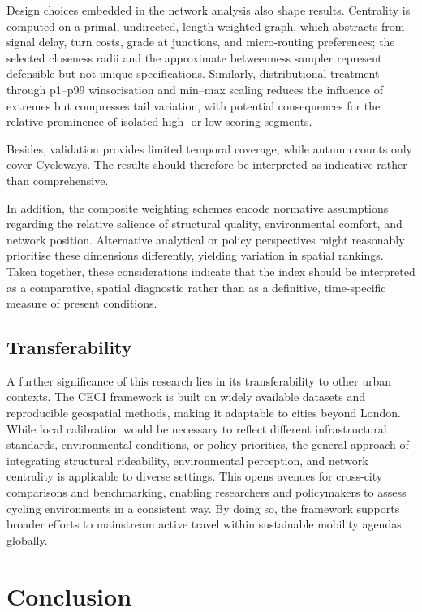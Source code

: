 \documentclass[
  12pt,
  oneside]{book}
\begin{document}
Design choices embedded in the network analysis also shape results. Centrality is computed on a primal, undirected, length-weighted graph, which abstracts from signal delay, turn costs, grade at junctions, and micro-routing preferences; the selected closeness radii and the approximate betweenness sampler represent defensible but not unique specifications. Similarly, distributional treatment through p1--p99 winsorisation and min--max scaling reduces the influence of extremes but compresses tail variation, with potential consequences for the relative prominence of isolated high- or low-scoring segments.

Besides, validation provides limited temporal coverage, while autumn counts only cover Cycleways. The results should therefore be interpreted as indicative rather than comprehensive.

In addition, the composite weighting schemes encode normative assumptions regarding the relative salience of structural quality, environmental comfort, and network position. Alternative analytical or policy perspectives might reasonably prioritise these dimensions differently, yielding variation in spatial rankings. Taken together, these considerations indicate that the index should be interpreted as a comparative, spatial diagnostic rather than as a definitive, time-specific measure of present conditions.

\section{Transferability}\label{transferability}

A further significance of this research lies in its transferability to other urban contexts. The CECI framework is built on widely available datasets and reproducible geospatial methods, making it adaptable to cities beyond London. While local calibration would be necessary to reflect different infrastructural standards, environmental conditions, or policy priorities, the general approach of integrating structural rideability, environmental perception, and network centrality is applicable to diverse settings. This opens avenues for cross-city comparisons and benchmarking, enabling researchers and policymakers to assess cycling environments in a consistent way. By doing so, the framework supports broader efforts to mainstream active travel within sustainable mobility agendas globally.

\chapter{Conclusion}\label{conclusion-1}
\end{document}
